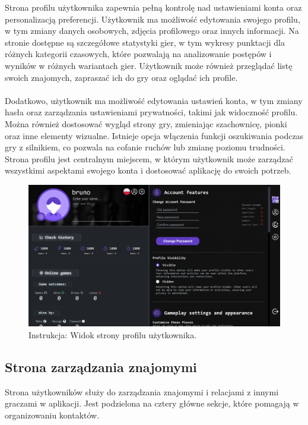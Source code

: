 \documentclass[twoside]{projektInzynierskiMS1}
\begin{document}
\noindent
Strona profilu użytkownika zapewnia pełną kontrolę nad ustawieniami konta oraz personalizacją preferencji. Użytkownik ma możliwość edytowania swojego profilu, w tym zmiany danych osobowych, zdjęcia profilowego oraz innych informacji. Na stronie dostępne są szczegółowe statystyki gier, w tym wykresy punktacji dla różnych kategorii czasowych, które pozwalają na analizowanie postępów i wyników w różnych wariantach gier. Użytkownik może również przeglądać listę swoich znajomych, zapraszać ich do gry oraz oglądać ich profile.
\\\\
Dodatkowo, użytkownik ma możliwość edytowania ustawień konta, w tym zmiany hasła oraz zarządzania ustawieniami prywatności, takimi jak widoczność profilu. Można również dostosować wygląd strony gry, zmieniając szachownicę, pionki oraz inne elementy wizualne. Istnieje opcja włączenia funkcji oszukiwania podczas gry z silnikiem, co pozwala na cofanie ruchów lub zmianę poziomu trudności. Strona profilu jest centralnym miejscem, w którym użytkownik może zarządzać wszystkimi aspektami swojego konta i dostosować aplikację do swoich potrzeb.

\vspace{0.5cm}
\begin{figure}[h!]
    \centering
    \includegraphics[width=1\textwidth]{images/ins_account.png}
    \caption{Instrukcja: Widok strony profilu użytkownika.}
\end{figure}

\newpage

\subsection{Strona zarządzania znajomymi}

\noindent
Strona użytkowników służy do zarządzania znajomymi i relacjami z innymi graczami w aplikacji. Jest podzielona na cztery główne sekcje, które pomagają w organizowaniu kontaktów.
\end{document}

